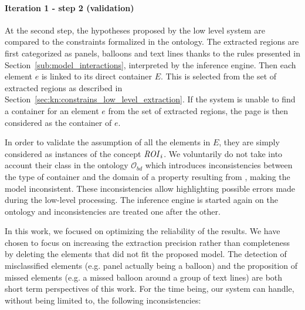 
\paragraph{Iteration 1 - step 2 (validation)} %
\label{par:step_2}
At the second step, the hypotheses proposed by the low level system are compared to the constraints formalized in the ontology.
The extracted regions are first categorized as panels, balloons and text lines thanks to the rules presented in Section~\ref{sub:model_interactions}, interpreted by the inference engine.
Then each element $e$ is linked to its direct container $E$.
This is selected from the set of extracted regions as described in Section~\ref{sec:kn:constrains_low_level_extraction}.
If the system is unable to find a container for an element $e$ from the set of extracted regions, the page is then considered as the container of $e$.

In order to validate the assumption of all the elements in $E$, they are simply considered as instances of the concept ${\it ROI}_i$.
We voluntarily do not take into account their class in the ontology $\mathcal{O}_ {bd}$ which introduces inconsistencies between the type of container and the domain of a property resulting from , making the model inconsistent.
These inconsistencies allow highlighting possible errors made during the low-level processing.
The inference engine is started again on the ontology and inconsistencies are treated one after the other.

In this work, we focused on optimizing the reliability of the results.
We have chosen to focus on increasing the extraction precision rather than completeness by deleting the elements that did not fit the proposed model.
The detection of misclassified elements (e.g. panel actually being a balloon) and the proposition of missed elements (e.g. a missed balloon around a group of text lines) are both short term perspectives of this work.
For the time being, our system can handle, without being limited to, the following inconsistencies:

